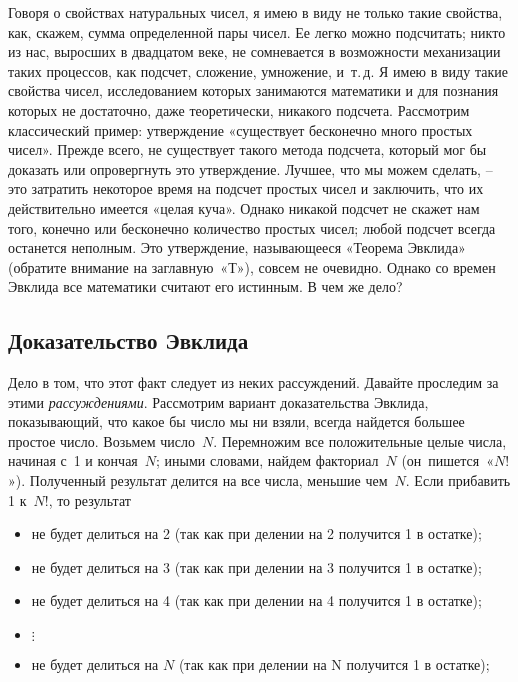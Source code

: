 \documentclass[../main.tex]{subfiles}
\begin{document}
Говоря о свойствах натуральных чисел, я имею в виду не только такие свойства, как, скажем, сумма определенной пары чисел. Ее легко можно подсчитать; никто из нас, выросших в двадцатом веке, не сомневается в возможности механизации таких процессов, как подсчет, сложение, умножение, и~т.\,д. Я имею в виду такие свойства чисел, исследованием которых занимаются математики и для познания которых не достаточно, даже теоретически, никакого подсчета. Рассмотрим классический пример: утверждение «существует бесконечно много простых чисел». Прежде всего, не существует такого метода подсчета, который мог бы доказать или опровергнуть это утверждение. Лучшее, что мы можем сделать, \--- это затратить некоторое время на подсчет простых чисел и заключить, что их действительно имеется «целая куча». Однако никакой подсчет не скажет нам того, конечно или бесконечно количество простых чисел; любой подсчет всегда останется неполным. Это утверждение, называющееся «Теорема Эвклида» (обратите внимание на заглавную~«Т»), совсем не очевидно. Однако со времен Эвклида все математики считают его истинным. В чем же дело?



\subsection{Доказательство Эвклида}

Дело в том, что этот факт следует из неких рассуждений. Давайте проследим за этими \emph{рассуждениями}. Рассмотрим вариант доказательства Эвклида, показывающий, что какое бы число мы ни взяли, всегда найдется большее простое число. Возьмем число~$N$. Перемножим все положительные целые числа, начиная с~1 и кончая~$N$; иными словами, найдем факториал~$N$ (он~пишется~«$N!$»). Полученный результат делится на все числа, меньшие чем~$N$. Если прибавить 1 к~$N!$, то результат
%
\begin{itemize}[label={}, noitemsep, topsep=6pt]
    \item не будет делиться на 2 (так как при делении на 2 получится 1 в остатке);
    \item не будет делиться на 3 (так как при делении на 3 получится 1 в остатке);
    \item не будет делиться на 4 (так как при делении на 4 получится 1 в остатке);
    \item $\vdots$
    \item не будет делиться на $N$ (так как при делении на N получится 1 в остатке);
\end{itemize}
\end{document}
